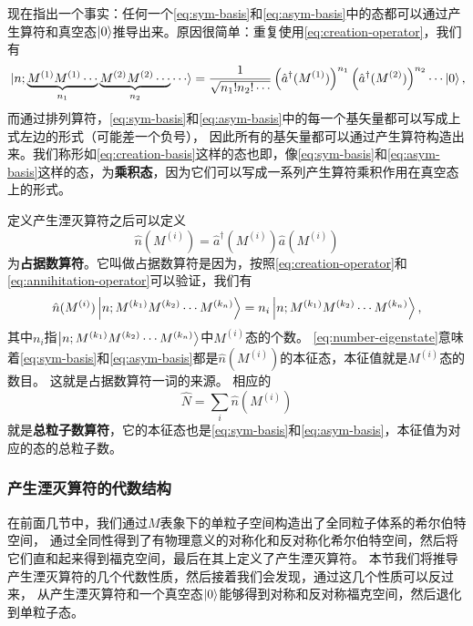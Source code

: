 \documentclass[hyperref, UTF8, a4paper]{ctexart}
\begin{document}
现在指出一个事实：任何一个\eqref{eq:sym-basis}和\eqref{eq:asym-basis}中的态都可以通过产生算符和真空态$\ket{0}$推导出来。原因很简单：重复使用\eqref{eq:creation-operator}，我们有
\begin{equation}
    \ket*{n; \underbrace{M^{(1)} M^{(1)} \cdots}_{n_1} \underbrace{M^{(2)} M^{(2)} \cdots}_{n_2} \cdots} = \frac{1}{\sqrt{n_1! n_2! \cdots}} \left(\hat{a}^\dagger (M^{(1)})\right)^{n_1} \left(\hat{a}^\dagger (M^{(2)})\right)^{n_2} \cdots \ket{0},
    \label{eq:creation-basis}
\end{equation}
而通过排列算符，\eqref{eq:sym-basis}和\eqref{eq:asym-basis}中的每一个基矢量都可以写成上式左边的形式（可能差一个负号），
因此所有的基矢量都可以通过产生算符构造出来。我们称形如\eqref{eq:creation-basis}这样的态也即，像\eqref{eq:sym-basis}和\eqref{eq:asym-basis}这样的态，为\textbf{乘积态}，因为它们可以写成一系列产生算符乘积作用在真空态上的形式。

定义产生湮灭算符之后可以定义
\begin{equation}
    \hat{n}(M^{(i)}) = \hat{a}^\dagger (M^{(i)}) \hat{a} (M^{(i)})
    \label{eq:number-operator}
\end{equation}
为\textbf{占据数算符}。它叫做占据数算符是因为，按照\eqref{eq:creation-operator}和\eqref{eq:annihitation-operator}可以验证，我们有
\begin{equation}
    \hat{n}(M^{(i)}) \ket{n; M^{(k_1)} M^{(k_2)} \cdots M^{(k_n)}} = n_i \ket{n; M^{(k_1)} M^{(k_2)} \cdots M^{(k_n)}},
    \label{eq:number-eigenstate}
\end{equation}
其中$n_i$指$\ket{n; M^{(k_1)} M^{(k_2)} \cdots M^{(k_n)}}$中$M^{(i)}$态的个数。
\eqref{eq:number-eigenstate}意味着\eqref{eq:sym-basis}和\eqref{eq:asym-basis}都是$\hat{n}(M^{(i)})$的本征态，本征值就是$M^{(i)}$态的数目。
这就是占据数算符一词的来源。
相应的
\begin{equation}
    \hat{N} = \sum_i \hat{n}(M^{(i)})
    \label{eq:total-number-operator}
\end{equation}
就是\textbf{总粒子数算符}，它的本征态也是\eqref{eq:sym-basis}和\eqref{eq:asym-basis}，本征值为对应的态的总粒子数。

\subsubsection{产生湮灭算符的代数结构}\label{sec:algebra-ca-op}

在前面几节中，我们通过$M$表象下的单粒子空间构造出了全同粒子体系的希尔伯特空间，
通过全同性得到了有物理意义的对称化和反对称化希尔伯特空间，然后将它们直和起来得到福克空间，最后在其上定义了产生湮灭算符。
本节我们将推导产生湮灭算符的几个代数性质，然后接着我们会发现，通过这几个性质可以反过来，
从产生湮灭算符和一个真空态$\ket{0}$能够得到对称和反对称福克空间，然后退化到单粒子态。
\end{document}
